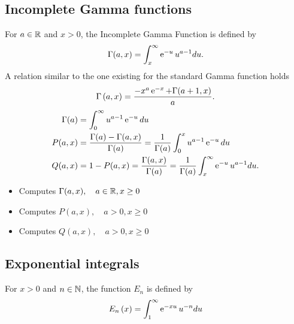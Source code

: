 \subsection{Incomplete Gamma functions}

For $a \in {\mathbb R}$ and $x>0$, the Incomplete Gamma Function is defined by
\begin{equation*}
  \Gamma(a, x)=\int_x^{\infty} \operatorname{e}^{ -u } u^{a-1} du.
\end{equation*}
A relation similar to the one existing for the standard Gamma function holds
\begin{equation*}
  \Gamma\left( a, x \right)= \frac{- x^{a} \operatorname{e}^{ -x } + \Gamma (a+1, x)}{a}.
\end{equation*}
\begin{align*}
  \Gamma(a)&=\int_0^{\infty} u^{a-1} \operatorname{e}^{ -u }du\\ 
  P(a, x) &= \frac{\Gamma(a) - \Gamma(a, x)}{\Gamma(a)} =
  \frac{1}{\Gamma(a)} \int_0^x u^{a-1} \operatorname{e}^{ -u }  du\\ 
  Q(a, x) &= 1-P(a, x) =\frac{\Gamma(a, x)}{\Gamma(a)} =
  \frac{1}{\Gamma(a)} \int_x^{\infty} \operatorname{e}^{ -u } u^{a-1} du. 
\end{align*}

\begin{itemize}
\item {}
  \sshortdescribe   Computes $\Gamma(a, x), \quad a \in {\mathbb R} , x \geq 0$
\item {}
  \sshortdescribe  Computes $P(a, x), \quad a > 0 , x \geq 0$
\item {}
  \sshortdescribe  Computes $Q(a, x), \quad a > 0 , x \geq 0$
\end{itemize}

\subsection{Exponential integrals}
For $x>0$ and $n \in {\mathbb N}$, the  function $E_n$ is defined by
\begin{equation*}
  E_n\left( x \right)=\int_{1}^{\infty} \operatorname{e}^{ -x u } u^{-n} du
\end{equation*}

